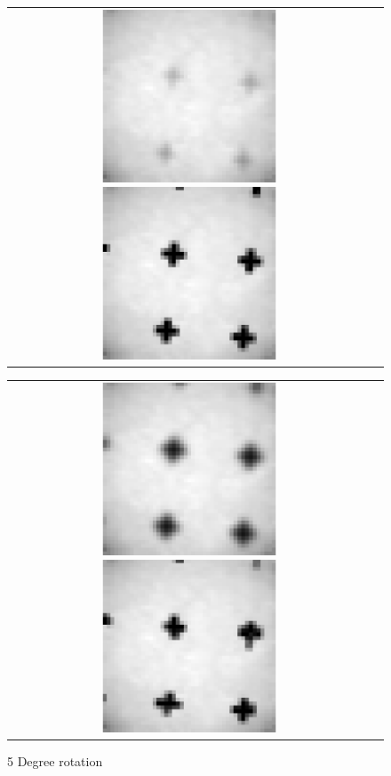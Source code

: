 \documentclass[iop]{emulateapj}
\begin{document}
\begin{figure}
        \begin{tabular}{cc}
            \includegraphics[width=0.5\textwidth]{rot_5_1}
            \includegraphics[width=0.5\textwidth]{rot_5_2}
        \end{tabular}
        \begin{tabular}{cc}
            \includegraphics[width=0.5\textwidth]{rot_5_3}
            \includegraphics[width=0.5\textwidth]{rot_5_4}
        \end{tabular}
        \caption{5 Degree rotation}
\end{figure}
\end{document}

